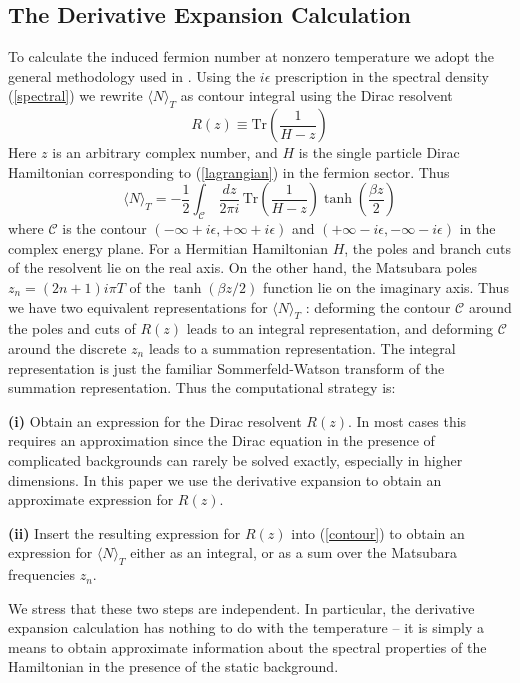 \documentclass[a4paper,prd,showpacs,showkeys]{revtex4}
\begin{document}
\subsection{The Derivative Expansion Calculation}

To calculate the induced fermion number at nonzero temperature we adopt the general methodology used in \cite{dunneian}. Using the $i \epsilon$ prescription in the spectral density (\ref{spectral}) we rewrite $\langle N\rangle _T$ as contour integral using the Dirac resolvent
\begin{equation}
R(z) \equiv \textrm{Tr}\left( \frac{1}{H-z}\right)
\label{resolvent}
\end{equation}
Here $z$ is an arbitrary complex number, and $H$ is the single particle Dirac Hamiltonian corresponding to (\ref{lagrangian}) in the fermion sector. Thus
\begin{equation}
\langle N\rangle _T=-\frac{1}{2}\int _{\mathcal{C}}\, \frac{dz}{2 \pi i} \, \textrm{Tr} \left(\frac{1}{H-z}\right) \tanh \left(\frac{\beta z}{2}\right)
\label{contour}
\end{equation}
where $\mathcal{C}$ is the contour $(-\infty +i \epsilon, +\infty +i
\epsilon)$ and $(+\infty -i \epsilon, -\infty -i \epsilon)$ in the
complex energy plane.  For a Hermitian Hamiltonian $H$, the poles and
branch cuts of the resolvent lie on the real axis. On the other hand,
the Matsubara poles $z_n=(2n+1)i \pi T$ of the $\tanh(\beta z/2)$ function lie on the imaginary axis. Thus we have two
equivalent representations for $\langle N\rangle _T$ :  deforming
the contour $\mathcal{C}$ around the poles and cuts of $R(z)$ leads to
an integral representation, and deforming $\mathcal{C}$ around the
discrete $z_n$ leads to a summation representation. The integral
representation is just the familiar Sommerfeld-Watson transform of the
summation representation. Thus the computational strategy is:

{\bf (i)} Obtain an expression for the Dirac resolvent $R(z)$.  In most cases this requires an approximation since the Dirac equation in the presence of complicated backgrounds can rarely be solved exactly, especially in higher dimensions. In this paper we use the derivative expansion to obtain an approximate expression for $R(z)$.

{\bf (ii)} Insert the resulting expression for $R(z)$ into (\ref{contour}) to obtain an expression for $\langle N \rangle _T$ either as an integral, or as a sum over the Matsubara frequencies $z_n$. 

We stress that these two steps are independent. In particular, the derivative expansion calculation has nothing to do with the temperature -- it is simply a means to obtain approximate information about the spectral properties of the Hamiltonian in the presence of the static background. 
\end{document}
